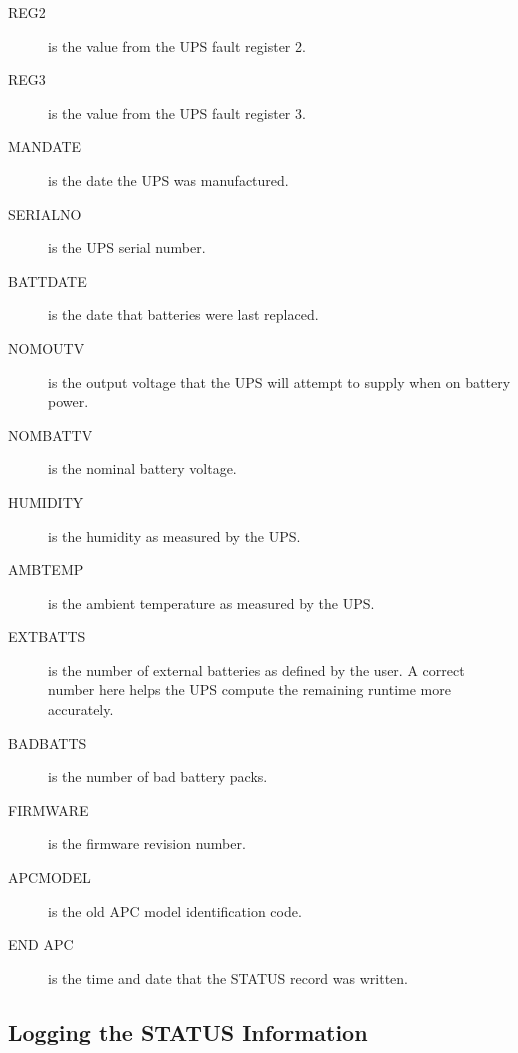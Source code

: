 {{{{{{{{{{{{{{{\begin{description}
\item [REG2]
   is the value from the UPS fault register 2.  

\item [REG3]
   is the value from the UPS fault register 3.  

\item [MANDATE]
   is the date the UPS was manufactured.  

\item [SERIALNO]
   is the UPS serial number.  

\item [BATTDATE]
   is the date that batteries were last replaced.  

\item [NOMOUTV]
   is the output voltage that the UPS will attempt to supply when on battery
power.  

\item [NOMBATTV]
   is the nominal battery voltage.  

\item [HUMIDITY]
   is the humidity as measured by the UPS.  

\item [AMBTEMP]
   is the ambient temperature as measured by the UPS.  

\item [EXTBATTS]
   is the number of external batteries as defined by the user. A correct number
here helps the UPS compute the remaining runtime more accurately.  

\item [BADBATTS]
   is the number of bad battery packs.  

\item [FIRMWARE]
   is the firmware revision number.  

\item [APCMODEL]
   is the old APC model identification code.  

\item [END APC]
   is the time and date that the STATUS record was written. 
\end{description}

\label{Logging-the-STATUS-Information}

\subsection*{Logging the STATUS Information}

}}}}}}}}}}}}}}}
